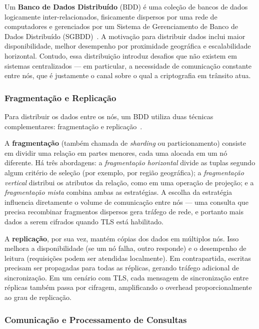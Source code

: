 \documentclass[12pt]{article}
\begin{document}
Um \textbf{Banco de Dados Distribuído} (BDD) é uma coleção de bancos de dados
logicamente inter-relacionados, fisicamente dispersos por uma rede de
computadores e gerenciados por um Sistema de Gerenciamento de Banco de Dados
Distribuído (SGBDD)~\cite{elmasri2016fundamentals}. A motivação para distribuir
dados inclui maior disponibilidade, melhor desempenho por proximidade
geográfica e escalabilidade horizontal. Contudo, essa distribuição introduz
desafios que não existem em sistemas centralizados --- em particular, a
necessidade de comunicação constante entre nós, que é justamente o canal sobre
o qual a criptografia em trânsito atua.

\subsubsection{Fragmentação e Replicação}

Para distribuir os dados entre os nós, um BDD utiliza duas técnicas
complementares: fragmentação e replicação~\cite{elmasri2016fundamentals}.

A \textbf{fragmentação} (também chamada de \emph{sharding} ou particionamento)
consiste em dividir uma relação em partes menores, cada uma alocada em um nó
diferente. Há três abordagens: a \emph{fragmentação horizontal} divide as
tuplas segundo algum critério de seleção (por exemplo, por região geográfica);
a \emph{fragmentação vertical} distribui os atributos da relação, como em uma operação de projeção; e a
\emph{fragmentação mista} combina ambas as estratégias. A escolha da estratégia
influencia diretamente o volume de comunicação entre nós --- uma consulta que
precisa recombinar fragmentos dispersos gera tráfego de rede, e portanto mais
dados a serem cifrados quando TLS está habilitado.

A \textbf{replicação}, por sua vez, mantém cópias dos dados em múltiplos nós.
Isso melhora a disponibilidade (se um nó falha, outro responde) e o desempenho
de leitura (requisições podem ser atendidas localmente). Em contrapartida,
escritas precisam ser propagadas para todas as réplicas, gerando tráfego
adicional de sincronização. Em um cenário com TLS, cada mensagem de
sincronização entre réplicas também passa por cifragem, amplificando o overhead
proporcionalmente ao grau de replicação.

\subsubsection{Comunicação e Processamento de Consultas}
\end{document}
